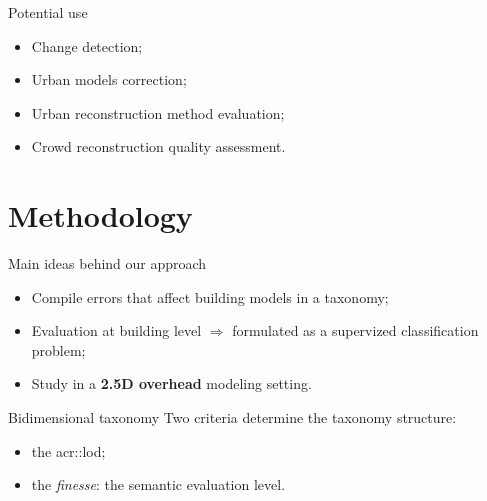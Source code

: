 \documentclass[10pt, export]{beamer}
\begin{document}
        \begin{frame}{Potential use}
            \begin{itemize}[label=$\blacktriangleright$, font=\color{IGNGreen}, itemsep=2em]
                \item<1-> Change detection;
                \item<2-> Urban models correction;
                \item<3-> Urban reconstruction method evaluation;
                \item<4-> Crowd reconstruction quality assessment.
            \end{itemize}
        \end{frame}

    \section{Methodology}
        \begin{frame}{Main ideas behind our approach}
            \begin{itemize}[label=$\blacktriangleright$, font=\color{IGNGreen}]
                \item<1-> Compile errors that affect building models in a taxonomy;
                \item<2-> Evaluation at building level $\Longrightarrow$ formulated as a supervized classification problem;
                \item<3-> Study in a \textbf{2.5D overhead} modeling setting.
            \end{itemize}
        \end{frame}
        \begin{frame}{Bidimensional taxonomy}
            Two criteria determine the taxonomy structure:
            \begin{itemize}[label=$\blacktriangleright$, font=\color{IGNGreen}]
                \item<1-> the \acrshort{acr::lod};
                \item<2-> the \emph{finesse}: the semantic evaluation level.
            \end{itemize}
        \end{frame}
\end{document}
